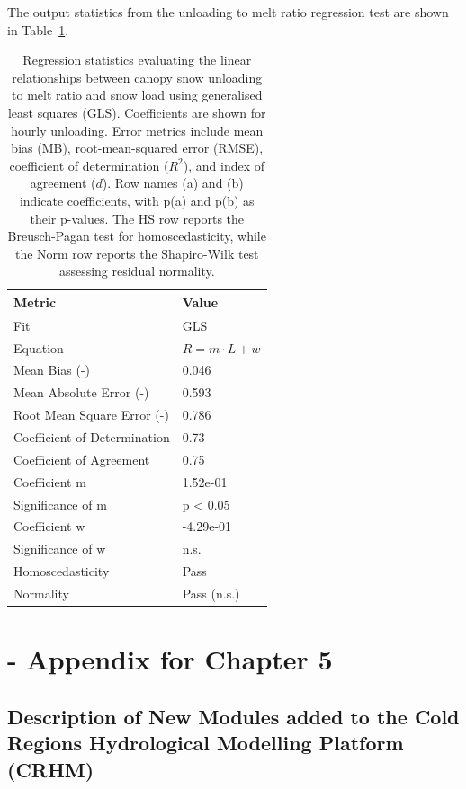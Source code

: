 \documentclass[
  letterpaper,
]{tex/uofsthesis-cs}
\begin{document}
The output statistics from the unloading to melt ratio regression test
are shown in Table~\ref{tbl-unld-melt-ratio}.

\begin{longtable}[]{@{}ll@{}}

\caption{\label{tbl-unld-melt-ratio}Regression statistics evaluating the
linear relationships between canopy snow unloading to melt ratio and
snow load using generalised least squares (GLS). Coefficients are shown
for hourly unloading. Error metrics include mean bias (MB),
root-mean-squared error (RMSE), coefficient of determination (\(R^2\)),
and index of agreement (\(d\)). Row names (a) and (b) indicate
coefficients, with p(a) and p(b) as their p-values. The HS row reports
the Breusch-Pagan test for homoscedasticity, while the Norm row reports
the Shapiro-Wilk test assessing residual normality.}

\tabularnewline

\toprule\noalign{}
Metric & Value \\
\midrule\noalign{}
\endhead
\bottomrule\noalign{}
\endlastfoot
Fit & GLS \\
Equation & \(R = m \cdot L + w\) \\
Mean Bias (-) & 0.046 \\
Mean Absolute Error (-) & 0.593 \\
Root Mean Square Error (-) & 0.786 \\
Coefficient of Determination & 0.73 \\
Coefficient of Agreement & 0.75 \\
Coefficient m & 1.52e-01 \\
Significance of m & p \textless{} 0.05 \\
Coefficient w & -4.29e-01 \\
Significance of w & n.s. \\
Homoscedasticity & Pass \\
Normality & Pass (n.s.) \\

\end{longtable}

\chapter{- Appendix for Chapter 5}\label{sec-appdx-ch5}

\section{Description of New Modules added to the Cold Regions
Hydrological Modelling Platform
(CRHM)}\label{description-of-new-modules-added-to-the-cold-regions-hydrological-modelling-platform-crhm}
\end{document}
